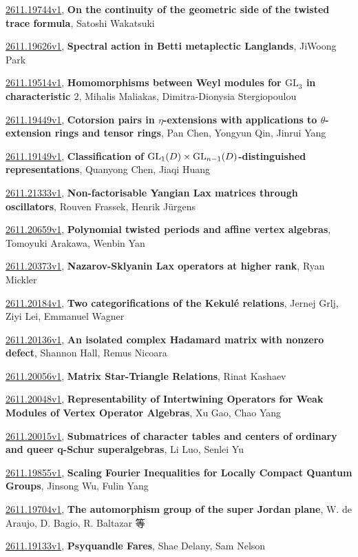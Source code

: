 \documentclass[9pt, a4paper]{article}
\theoremstyle{plain}
\theoremstyle{definition}
\theoremstyle{remark}
\newcommand{\arxiv}[3]{\href{https://arxiv.org/abs/#1}{#1}, \textbf{\textcolor{arxivblue}{#2}}, #3}
\begin{document}
\arxiv{2611.19744v1}{On the continuity of the geometric side of the twisted trace formula}{Satoshi Wakatsuki}

\arxiv{2611.19626v1}{Spectral action in Betti metaplectic Langlands}{JiWoong Park}

\arxiv{2611.19514v1}{Homomorphisms between Weyl modules for $\mathrm{GL}_3$ in characteristic $2$}{Mihalis Maliakas, Dimitra-Dionysia Stergiopoulou}

\arxiv{2611.19449v1}{Cotorsion pairs in $η$-extensions with applications to $θ$-extension rings and tensor rings}{Pan Chen, Yongyun Qin, Jinrui Yang}

\arxiv{2611.19149v1}{Classification of ${\rm GL}_1(D)\times {\rm GL}_{n-1}(D)$-distinguished representations}{Quanyong Chen, Jiaqi Huang}

\arxiv{2611.21333v1}{Non-factorisable Yangian Lax matrices through oscillators}{Rouven Frassek, Henrik Jürgens}

\arxiv{2611.20659v1}{Polynomial twisted periods and affine vertex algebras}{Tomoyuki Arakawa, Wenbin Yan}

\arxiv{2611.20373v1}{Nazarov-Sklyanin Lax operators at higher rank}{Ryan Mickler}

\arxiv{2611.20184v1}{Two categorifications of the Kekulé relations}{Jernej Grlj, Ziyi Lei, Emmanuel Wagner}

\arxiv{2611.20136v1}{An isolated complex Hadamard matrix with nonzero defect}{Shannon Hall, Remus Nicoara}

\arxiv{2611.20056v1}{Matrix Star-Triangle Relations}{Rinat Kashaev}

\arxiv{2611.20048v1}{Representability of Intertwining Operators for Weak Modules of Vertex Operator Algebras}{Xu Gao, Chao Yang}

\arxiv{2611.20015v1}{Submatrices of character tables and centers of ordinary and queer q-Schur superalgebras}{Li Luo, Senlei Yu}

\arxiv{2611.19855v1}{Scaling Fourier Inequalities for Locally Compact Quantum Groups}{Jinsong Wu, Fulin Yang}

\arxiv{2611.19704v1}{The automorphism group of the super Jordan plane}{W. de Araujo, D. Bagio, R. Baltazar 等}

\arxiv{2611.19133v1}{Psyquandle Fares}{Shae Delany, Sam Nelson}

\end{document}
